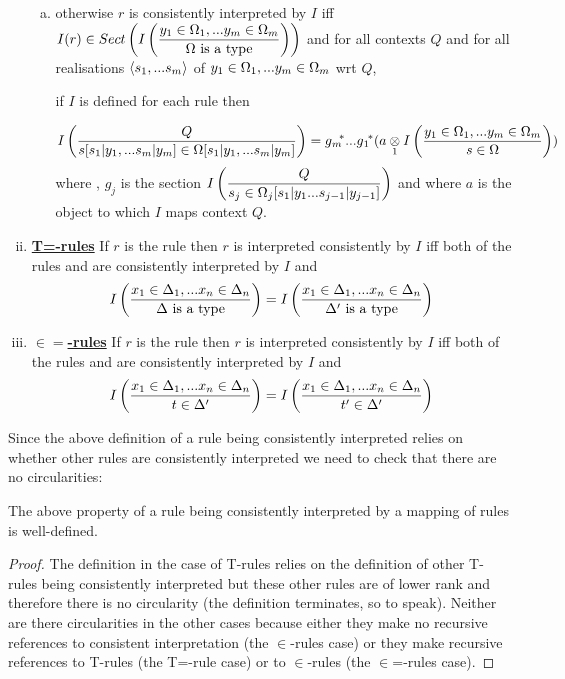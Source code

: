 \begin{definition}
\begin{enumerate}[(i)]
\begin{enumerate}[(a)]
\item otherwise $r$ is consistently interpreted by $I$ iff $\displaystyle I(r) \in \sectionsofImappedrule{\yOmega{m}}{\isT{\Omega}}$ and
for all contexts $Q$ and for all realisations $\tuple{\sm}$ of $\yOmega{m}$ wrt $Q$, 
\begin{newtt}
if $I$ is defined for each rule  then
\end{newtt}
$$ \Imappedrule{Q}{\ofT{s[\SUBsmFORym]}{\Omega[\SUBsmFORym]}} = \gmstar...\gonestar(\crossx{a}{\Imappedrule{\yOmega{m}}{\ofT{s}{\Omega}}}{1})$$
where \foreachj, $g_j$ is the section
$\displaystyle\Imappedrule{Q}{ \ofT{s_j}{\Omega_j [s_1|y_1...s_{j-1}|y_{j-1}]}}$
and where $a$ is the object to which $I$ maps context $Q$.
\end{enumerate}

\item \underline{\textbf{T=-rules}} 
If $r$ is the rule   
then $r$ is interpreted consistently by $I$ iff
both of the rules  and 
are consistently interpreted by $I$ and
$$
\Imappedrule{\xDelta{n}}{\isT{\Delta}} = \Imappedrule{\xDelta{n}}{\isT{\Delta'}}
$$
 
\item \underline{\textbf{$\boldsymbol{\in=}$-rules}} 
If $r$ is the rule   
then $r$ is interpreted consistently by $I$ iff
both of the rules  and 
are consistently interpreted by $I$ and
$$
\Imappedrule{\xDelta{n}}{\ofT{t}{\Delta'}} = \Imappedrule{\xDelta{n}}{\ofT{t'}{\Delta'}}
$$
\end{enumerate}
\end{definition}

Since the above definition of a rule being consistently interpreted relies on whether other rules are consistently interpreted we need to check that there are no circularities:
\begin{lemma}
The above property of a rule being consistently interpreted by a mapping of rules is well-defined. 
\end{lemma}
\begin{proof}
The definition in the case of T-rules relies on the definition of other T-rules being consistently interpreted but these other rules are of lower rank and therefore there is no circularity 
(the definition terminates, so to speak).
Neither are there circularities in the other cases because either they make no recursive references to consistent interpretation (the $\in$-rules case)
or they make recursive references to T-rules (the T=-rule case) or to $\in$-rules (the $\in$=-rules case).
\end{proof}

